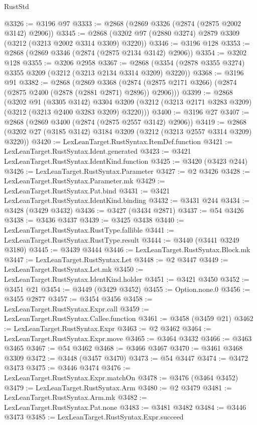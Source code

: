 \begin{lexlean}{RustStd}
\begin{coremodule}
{\begin{coremodule}
{{{{{{{{{{{{{{{{{{{{{{{{{{{{{{{{{{{{{{{{{{{{{{{{{{{{{{{{{{{{{{{{{{{{{{{{{{{{{{{{{{{{{@3326 := @3196 @97
@3333 := @2868 (@2869 @3326 (@2874 (@2875 @2002 @3142) @2906))
@3345 := @2868 (@3202 @97 (@2880 @3274) @2879 @3309 (@3212 (@3213 @2002 @3314 @3309) @3220))
@3346 := @3196 @128
@3353 := @2868 (@2869 @3346 (@2874 (@2875 @2134 @3142) @2906))
@3354 := @3202 @128
@3355 := @3206 @2958
@3367 := @2868 (@3354 (@2878 @3355 @3274) @3355 @3209 (@3212 (@3213 @2134 @3314 @3209) @3220))
@3368 := @3196 @91
@3382 := @2868
    (@2869
      @3368
      (@2874 (@2875 @2171 @3266) (@2874 (@2875 @2400 (@2878 (@2881 @2871) @2896)) @2906)))
@3399 := @2868
    (@3202
      @91
      (@3305 @3142)
      @3304
      @3209
      (@3212 (@3213 @2171 @3283 @3209) (@3212 (@3213 @2400 @3283 @3209) @3220)))
@3400 := @3196 @27
@3407 := @2868 (@2869 @3400 (@2874 (@2875 @2557 @3142) @2906))
@3419 := @2868 (@3202 @27 (@3185 @3142) @3184 @3209 (@3212 (@3213 @2557 @3314 @3209) @3220))
@3420 := LexLeanTarget.RustSyntax.ItemDef.function
@3421 := LexLeanTarget.RustSyntax.Ident.generated
@3423 := @3421 LexLeanTarget.RustSyntax.IdentKind.function
@3425 := @3420 (@3423 @244)
@3426 := LexLeanTarget.RustSyntax.Parameter
@3427 := @2 @3426
@3428 := LexLeanTarget.RustSyntax.Parameter.mk
@3429 := LexLeanTarget.RustSyntax.Pat.bind
@3431 := @3421 LexLeanTarget.RustSyntax.IdentKind.binding
@3432 := @3431 @244
@3434 := @3428 (@3429 @3432)
@3436 := @3427 (@3434 @2871)
@3437 := @54 @3426
@3438 := @3436 @3437
@3439 := @3425 @3438
@3440 := LexLeanTarget.RustSyntax.RustType.fallible
@3441 := LexLeanTarget.RustSyntax.RustType.result
@3444 := @3440 (@3441 @3249 @3180)
@3445 := @3439 @3444
@3446 := LexLeanTarget.RustSyntax.Block.mk
@3447 := LexLeanTarget.RustSyntax.Let
@3448 := @2 @3447
@3449 := LexLeanTarget.RustSyntax.Let.mk
@3450 := LexLeanTarget.RustSyntax.IdentKind.holder
@3451 := @3421 @3450
@3452 := @3451 @21
@3454 := @3449 (@3429 @3452)
@3455 := Option.none.{0}
@3456 := @3455 @2877
@3457 := @3454 @3456
@3458 := LexLeanTarget.RustSyntax.Expr.call
@3459 := LexLeanTarget.RustSyntax.Callee.function
@3461 := @3458 (@3459 @21)
@3462 := LexLeanTarget.RustSyntax.Expr
@3463 := @2 @3462
@3464 := LexLeanTarget.RustSyntax.Expr.move
@3465 := @3464 @3432
@3466 := @3463 @3465
@3467 := @54 @3462
@3468 := @3466 @3467
@3470 := @3461 @3468 @3309
@3472 := @3448 (@3457 @3470)
@3473 := @54 @3447
@3474 := @3472 @3473
@3475 := @3446 @3474
@3476 := LexLeanTarget.RustSyntax.Expr.matchOn
@3478 := @3476 (@3464 @3452)
@3479 := LexLeanTarget.RustSyntax.Arm
@3480 := @2 @3479
@3481 := LexLeanTarget.RustSyntax.Arm.mk
@3482 := LexLeanTarget.RustSyntax.Pat.none
@3483 := @3481 @3482
@3484 := @3446 @3473
@3485 := LexLeanTarget.RustSyntax.Expr.succeed
}}}}}}}}}}}}}}}}}}}}}}}}}}}}}}}}}}}}}}}}}}}}}}}}}}}}}}}}}}}}}}}}}}}}}}}}}}}}}}}}}}}}}
\end{coremodule}}
\end{coremodule}
\end{lexlean}
